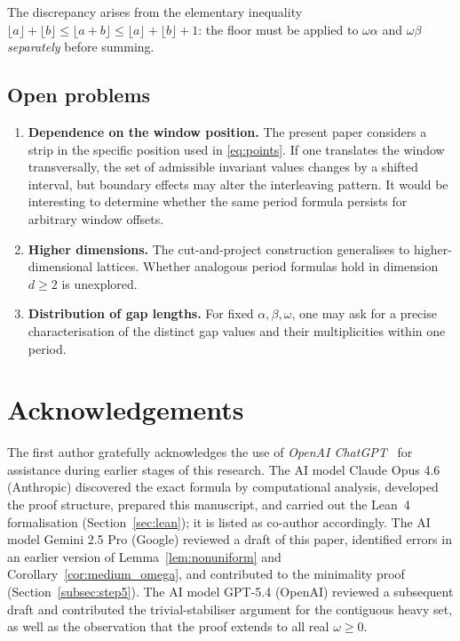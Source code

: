 \documentclass[11pt]{article}
\theoremstyle{plain}
\theoremstyle{definition}
\theoremstyle{remark}
\begin{document}
The discrepancy arises from the elementary inequality
$\lfloor a \rfloor + \lfloor b \rfloor \le \lfloor a+b \rfloor
\le \lfloor a \rfloor + \lfloor b \rfloor + 1$:
the floor must be applied to $\omega\alpha$ and $\omega\beta$
\emph{separately} before summing.

\subsection{Open problems}

\begin{enumerate}
    \item \textbf{Dependence on the window position.}
    The present paper considers a strip in the specific position used in
    \eqref{eq:points}.  If one translates the window transversally, the set of
    admissible invariant values changes by a shifted interval, but boundary
    effects may alter the interleaving pattern.  It would be interesting to
    determine whether the same period formula persists for arbitrary window
    offsets.

    \item \textbf{Higher dimensions.}
    The cut-and-project construction generalises to higher-dimensional
    lattices.  Whether analogous period formulas hold in dimension $d \ge 2$
    is unexplored.

    \item \textbf{Distribution of gap lengths.}
    For fixed $\alpha, \beta, \omega$, one may ask for a precise
    characterisation of the distinct gap values and their multiplicities
    within one period.
\end{enumerate}

\section*{Acknowledgements}

The first author gratefully acknowledges the use of \emph{OpenAI
ChatGPT}~\cite{ChatGPT} for assistance during earlier stages of this
research.
The AI model Claude Opus 4.6 (Anthropic) discovered the exact formula by
computational analysis, developed the proof structure, prepared this
manuscript, and carried out the Lean~4 formalisation
(Section~\ref{sec:lean}); it is listed as co-author accordingly.
The AI model Gemini 2.5 Pro (Google) reviewed a draft of this paper,
identified errors in an earlier version of Lemma~\ref{lem:nonuniform}
and Corollary~\ref{cor:medium_omega}, and contributed to the
minimality proof (Section~\ref{subsec:step5}).
The AI model GPT-5.4 (OpenAI) reviewed a subsequent draft and
contributed the trivial-stabiliser argument for the contiguous heavy
set, as well as the observation that the proof extends to all real
$\omega \ge 0$.
\end{document}
